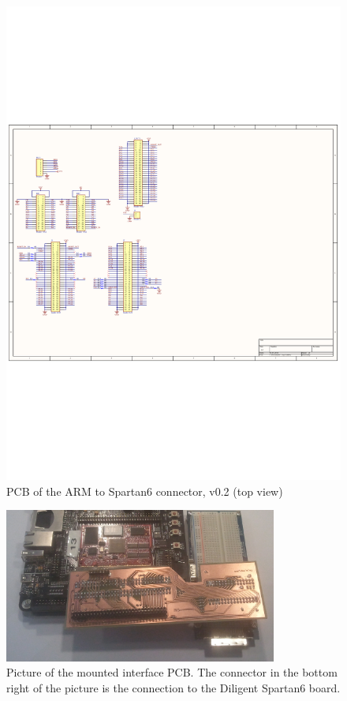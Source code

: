 \begin{figure}[H]
	\begin{centering}
		 \includegraphics[height=0.8\textwidth,page=2,angle=90]{content/appendix/eudp/images/dig_to_ea_v0_2}
		\caption{PCB of the ARM to Spartan6 connector, v0.2 (top view)}
	\end{centering}
\end{figure}

\begin{figure}[H]
	\begin{centering}
		\includegraphics[width=0.8\textwidth,page=1,angle=0]{content/appendix/eudp/images/interface_photo_v0_2.jpg}
		\caption{Picture of the mounted interface PCB. The connector in the bottom right of the picture is the connection to the Diligent Spartan6 board.}
		\label{fig:interface_photo_v0_2}
	\end{centering}
\end{figure}

